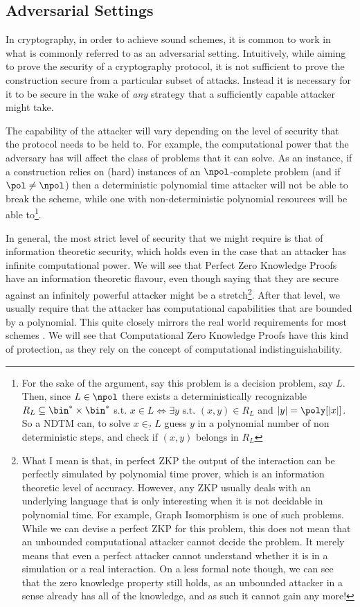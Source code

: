 \documentclass{article}
\begin{document}
\subsection{Adversarial Settings}
In cryptography, in order to achieve sound schemes, it is common to work in what is commonly referred to as an adversarial setting.
Intuitively, while aiming to prove the security of a cryptography protocol, it is not sufficient to prove the construction secure from a particular subset of attacks. Instead it is necessary for it to be secure in the wake of \textit{any} strategy that a sufficiently capable attacker might take. \par

The capability of the attacker will vary depending on the level of security that the protocol needs to be held to. For example, the computational power that the adversary has will affect the class of problems that it can solve.
As an instance, if a construction relies on (hard) instances of an $\npol$-complete problem (and if $\pol \neq \npol$) then a deterministic polynomial time attacker will not be able to break the scheme, while one with non-deterministic polynomial resources will be able to\footnote{For the sake of the argument, say this problem is a decision problem, say $L$. Then, since $L \in \npol$ there exists a deterministically recognizable $R_L \subseteq \bin^* \times \bin^* $ s.t. $x \in L \iff \exists y \text{ s.t. } (x, y) \in R_L$ and $|y| = \poly[|x|]$. So a NDTM can, to solve $x \in_? L$ guess $y$ in a polynomial number of non deterministic steps, and check if $(x, y)$ belongs in $R_L$ }.

In general, the most strict level of security that we might require is that of information theoretic security, which holds even in the case that
an attacker has infinite computational power. We will see that Perfect Zero Knowledge Proofs have an information theoretic flavour, even
though saying that they are secure against an infinitely powerful attacker might be a stretch\footnote{What I mean is that, in perfect ZKP the output of the interaction can be perfectly simulated by polynomial time prover, which is
    an information theoretic level of accuracy. However, any ZKP usually deals with an underlying language that is only interesting when it is not
    decidable in polynomial time. For example, Graph Isomorphism is one of such problems. While we can devise a perfect ZKP for this problem, this
    does not mean that an unbounded computational attacker cannot decide the problem. It merely means that even a perfect attacker cannot
    understand whether it is in a simulation or a real interaction. On a less formal note though, we can see that the zero knowledge
    property still holds, as an unbounded attacker in a sense already has all of the knowledge, and as such it cannot gain any more!}.
After that level, we usually require that the attacker has computational capabilities that are bounded by a polynomial.
This quite closely mirrors the real world requirements for most schemes \cite{shannonCommunicationTheorySecrecy1949}. We will see that Computational Zero Knowledge Proofs
have this kind of protection, as they rely on the concept of computational indistinguishability.
\end{document}
